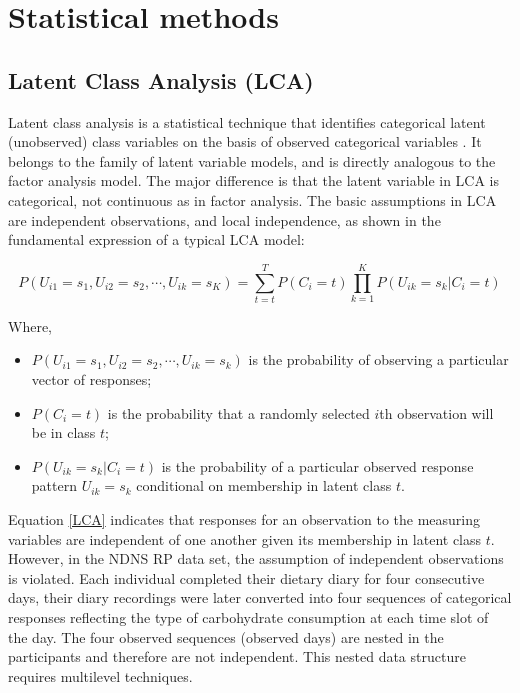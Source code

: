\section[Statistical methods]{Statistical methods}

\subsection{Latent Class Analysis (LCA)}\vspace{-0.3cm}

Latent class analysis is a statistical technique that identifies categorical latent (unobserved) class variables on the basis of observed categorical variables \parencite{collins2010latent}. It belongs to the family of latent variable models, and is directly analogous to the factor analysis model. The major difference is that the latent variable in LCA is categorical, not continuous as in factor analysis. The basic assumptions in LCA are independent observations, and local independence, as shown in the fundamental expression of a typical LCA model: \vspace{-0.8cm}

\begin{equation}
P(U_{i1} = s_1, U_{i2} = s_2, \cdots, U_{ik} = s_K) = \sum_{t=t}^{T}P(C_i = t)\prod_{k = 1}^{K}P(U_{ik} = s_k | C_i = t)
\label{LCA}
\end{equation}\vspace{-0.7cm}

Where, 

\begin{itemize}
	\item $P(U_{i1} = s_1, U_{i2} = s_2, \cdots, U_{ik} = s_k)$ is the probability of observing a particular vector of responses;
	\item $P(C_i = t)$ is the probability that a randomly selected $i$th observation will be in class $t$;
	\item $P(U_{ik} = s_k | C_i = t)$ is the probability of a particular observed response pattern $U_{ik} = s_k$ conditional on membership in latent class $t$.
\end{itemize}


Equation \ref{LCA} indicates that responses for an observation to the measuring variables are independent of one another given its membership in latent class $t$. However, in the NDNS RP data set, the assumption of independent observations is violated. Each individual completed their dietary diary for four consecutive days, their diary recordings were later converted into four sequences of categorical responses reflecting the type of carbohydrate consumption at each time slot of the day. The four observed sequences (observed days) are nested in the participants and therefore are not independent. This nested data structure requires multilevel techniques. 
\vspace{-0.3cm}

